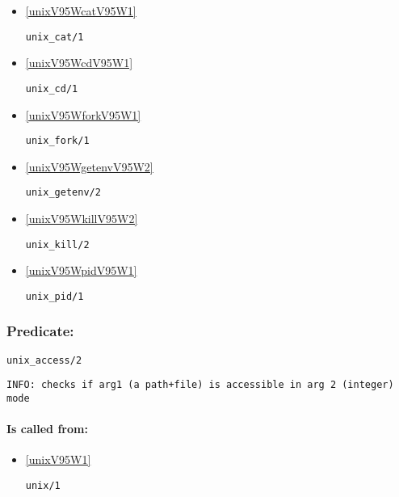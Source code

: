 \begin{itemize}
\item \ref{unixV95WcatV95W1} 
\begin{verbatim}
unix_cat/1
\end{verbatim}

\item \ref{unixV95WcdV95W1} 
\begin{verbatim}
unix_cd/1
\end{verbatim}

\item \ref{unixV95WforkV95W1} 
\begin{verbatim}
unix_fork/1
\end{verbatim}

\item \ref{unixV95WgetenvV95W2} 
\begin{verbatim}
unix_getenv/2
\end{verbatim}

\item \ref{unixV95WkillV95W2} 
\begin{verbatim}
unix_kill/2
\end{verbatim}

\item \ref{unixV95WpidV95W1} 
\begin{verbatim}
unix_pid/1
\end{verbatim}

\end{itemize}

\subsubsection{Predicate:} \label{unixV95WaccessV95W2}

\begin{verbatim}
unix_access/2
\end{verbatim}

{\small \begin{verbatim}
INFO: checks if arg1 (a path+file) is accessible in arg 2 (integer) mode

\end{verbatim}}
\paragraph{Is called from:} 
\begin{itemize}
\item \ref{unixV95W1} 
\begin{verbatim}
unix/1
\end{verbatim}

\end{itemize}

